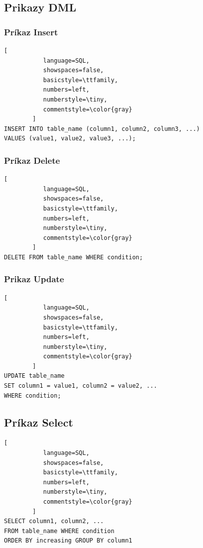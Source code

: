 \subsection{Prikazy \acl{DML}}
\subsubsection{Príkaz Insert}

\begin{lstlisting}[
           language=SQL,
           showspaces=false,
           basicstyle=\ttfamily,
           numbers=left,
           numberstyle=\tiny,
           commentstyle=\color{gray}           
        ]
INSERT INTO table_name (column1, column2, column3, ...)
VALUES (value1, value2, value3, ...);

\end{lstlisting}

\subsubsection{Príkaz Delete}

\begin{lstlisting}[
           language=SQL,
           showspaces=false,
           basicstyle=\ttfamily,
           numbers=left,
           numberstyle=\tiny,
           commentstyle=\color{gray}           
        ]
DELETE FROM table_name WHERE condition;

\end{lstlisting}

\subsubsection{Prikaz Update}
\begin{lstlisting}[
           language=SQL,
           showspaces=false,
           basicstyle=\ttfamily,
           numbers=left,
           numberstyle=\tiny,
           commentstyle=\color{gray}           
        ]
UPDATE table_name
SET column1 = value1, column2 = value2, ...
WHERE condition;

\end{lstlisting}

\subsection{Príkaz Select}

\begin{lstlisting}[
           language=SQL,
           showspaces=false,
           basicstyle=\ttfamily,
           numbers=left,
           numberstyle=\tiny,
           commentstyle=\color{gray}           
        ]
SELECT column1, column2, ...
FROM table_name WHERE condition 
ORDER BY increasing GROUP BY column1 

\end{lstlisting}
